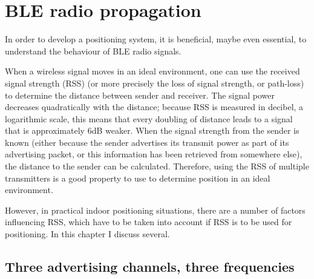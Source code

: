 \chapter{BLE radio propagation}
\label{chap:rss}
\newcommand{\packetlosscell}[1]{& \footnotesize{#1}}

In order to develop a \BLE positioning system, it is beneficial, maybe even essential, to understand the behaviour of BLE radio signals.

When a wireless signal moves in an ideal environment, one can use the received signal strength (RSS) (or more precisely the loss of signal strength, or path-loss) to determine the distance between sender and receiver.
The signal power decreases quadratically with the distance; because RSS is measured in decibel, a logarithmic scale, this means that every doubling of distance leads to a signal that is approximately 6dB weaker.
When the signal strength from the sender is known (either because the sender advertises its transmit power as part of its advertising packet, or this information has been retrieved from somewhere else), the distance to the sender can be calculated.
Therefore, using the RSS of multiple transmitters is a good property to use to determine position in an ideal environment.

However, in practical indoor positioning situations, there are a number of factors influencing RSS, which have to be taken into account if RSS is to be used for positioning.
In this chapter I discuss several.

\section{Three advertising channels, three frequencies}




